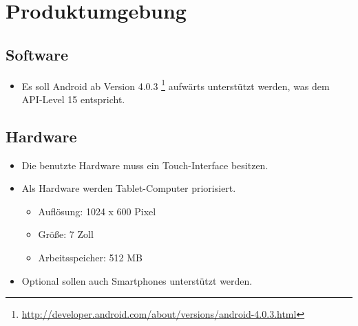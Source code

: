 \section{Produktumgebung}

\subsection{Software}
\begin{itemize}
	\item Es soll Android ab Version 4.0.3 \footnote{\url{http://developer.android.com/about/versions/android-4.0.3.html}} aufwärts unterstützt werden, was dem API-Level 15 entspricht.
\end{itemize}
\subsection{Hardware}
\begin{itemize}
	\item Die benutzte Hardware muss ein Touch-Interface besitzen.
	\item Als Hardware werden Tablet-Computer priorisiert.
	\begin{itemize}
		\item Auflösung: 1024 x 600 Pixel
		\item Größe: 7 Zoll
		\item Arbeitsspeicher: 512 MB
	\end{itemize}
	\item Optional sollen auch Smartphones unterstützt werden.
\end{itemize}
